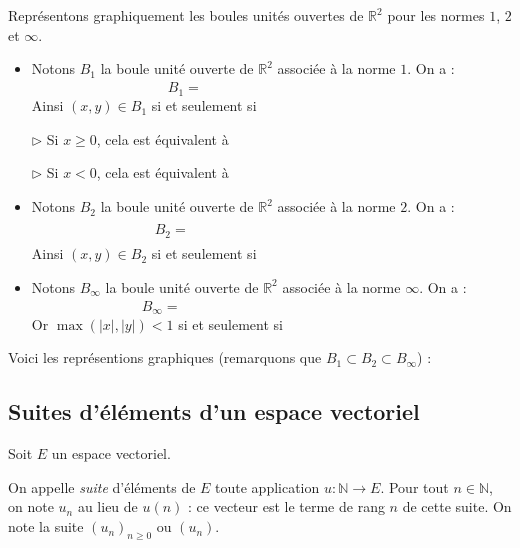 \documentclass[french,11pt,twoside]{VcCours}
\begin{document}
\medskip

\begin{Exemple} Représentons graphiquement les boules unités ouvertes de $\mathbb{R}^2$ pour les normes $1$, $2$ et $\infty$.

\begin{itemize}
\item Notons $B_1$ la boule unité ouverte de $\mathbb{R}^2$ associée à la norme $1$. On a :
$$ B_1 = \phantom{\lbrace (x,y) \in \mathbb{R}^2, \, \vert \, \vert x\vert + \vert y \vert <1 \rbrace}$$
Ainsi $(x,y) \in B_1$ si et seulement si \phantom{$-1- \vert x \vert < y < 1- \vert x \vert$.}

$\rhd$ Si $x \geq 0$, cela est équivalent à \phantom{$-1-x < y < 1-x$.}

$\rhd$ Si $x<0$, cela est équivalent à \phantom{$-1+x<y<1+x$.}
\item Notons $B_2$ la boule unité ouverte de $\mathbb{R}^2$ associée à la norme $2$. On a :
$$ B_2 = \phantom{\lbrace (x,y) \in \mathbb{R}^2, \, \vert \, \sqrt{\vert x\vert^2 + \vert y \vert^2} <1\rbrace} $$
Ainsi $(x,y) \in B_2$ si et seulement si \phantom{$\vert x\vert^2 + \vert y \vert^2<1$. }
\item Notons $B_{\infty}$ la boule unité ouverte de $\mathbb{R}^2$ associée à la norme $\infty$. On a :
$$ B_{\infty} = \phantom{\lbrace (x,y) \in \mathbb{R}^2, \, \max{(\vert x \vert, \vert y \vert)} <1 \rbrace}$$
Or $\max{(\vert x \vert, \vert y \vert)} <1$ si et seulement si \phantom{$\vert x \vert <1$ et $\vert y \vert <1$.}
\end{itemize}

\medskip

Voici les représentions graphiques (remarquons que $B_1 \subset B_2 \subset B_{\infty}$) :

\vspace{4cm}
\end{Exemple}

\subsection{Suites d'éléments d'un espace vectoriel}

\begin{Definition}{} Soit $E$ un espace vectoriel. 

On appelle \emph{suite} d'éléments de $E$ toute application $u : \mathbb{N} \rightarrow E$. Pour tout $n \in \mathbb{N}$, on note $u_n$ au lieu de $u(n)$ : ce vecteur est le terme de rang $n$ de cette suite. On note la suite $(u_n)_{ n \geq 0}$ ou $(u_n)$.
\end{Definition}
\end{document}
